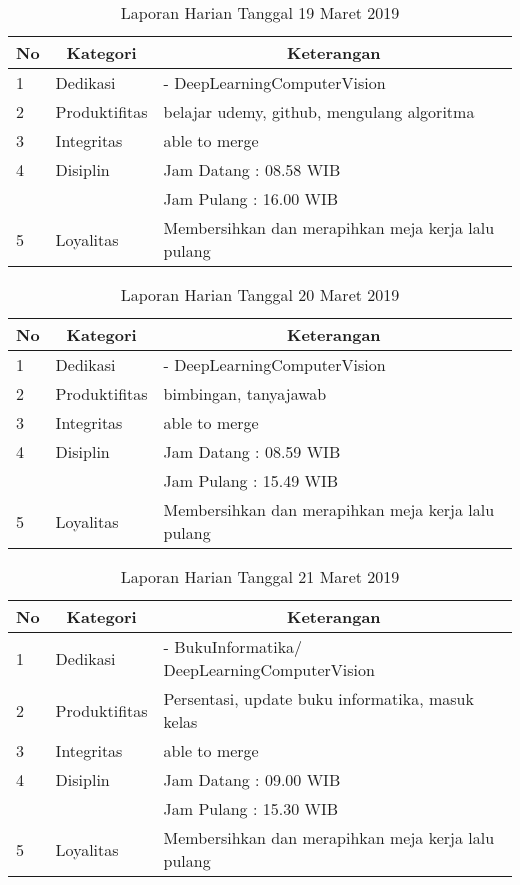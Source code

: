 \begin{table}[htp]
\caption{Laporan Harian Tanggal 19 Maret 2019}
\label{tab:lh190319}
\begin{tabular}{|l|l|l|}
\hline
\textbf{No} & \multicolumn{1}{c|}{\textbf{Kategori}} & \multicolumn{1}{c|}{\textbf{Keterangan}} \\ \hline
1 & Dedikasi & -  DeepLearningComputerVision \\ \hline
2 & Produktifitas & belajar udemy, github, mengulang algoritma \\
3 & Integritas & able to merge \\ \hline
4 & Disiplin & Jam Datang : 08.58 WIB \\
 &  & Jam Pulang : 16.00 WIB \\ \hline
5 & Loyalitas & Membersihkan dan merapihkan meja kerja lalu pulang  \\ \hline
\end{tabular}
\end{table}

\begin{table}[htp]
\caption{Laporan Harian Tanggal 20 Maret 2019}
\label{tab:lh200319}
\begin{tabular}{|l|l|l|}
\hline
\textbf{No} & \multicolumn{1}{c|}{\textbf{Kategori}} & \multicolumn{1}{c|}{\textbf{Keterangan}} \\ \hline
1 & Dedikasi & -  DeepLearningComputerVision \\ \hline
2 & Produktifitas & bimbingan, tanyajawab \\
3 & Integritas & able to merge \\ \hline
4 & Disiplin & Jam Datang : 08.59 WIB \\
 &  & Jam Pulang : 15.49 WIB \\ \hline
5 & Loyalitas & Membersihkan dan merapihkan meja kerja lalu pulang  \\ \hline
\end{tabular}
\end{table}

\begin{table}[htp]
\caption{Laporan Harian Tanggal 21 Maret 2019}
\label{tab:lh210319}
\begin{tabular}{|l|l|l|}
\hline
\textbf{No} & \multicolumn{1}{c|}{\textbf{Kategori}} & \multicolumn{1}{c|}{\textbf{Keterangan}} \\ \hline
1 & Dedikasi & - BukuInformatika/ DeepLearningComputerVision \\ \hline
2 & Produktifitas & Persentasi, update buku informatika, masuk kelas  \\
3 & Integritas & able to merge \\ \hline
4 & Disiplin & Jam Datang : 09.00 WIB \\
 &  & Jam Pulang : 15.30 WIB \\ \hline
5 & Loyalitas & Membersihkan dan merapihkan meja kerja lalu pulang  \\ \hline
\end{tabular}
\end{table}


